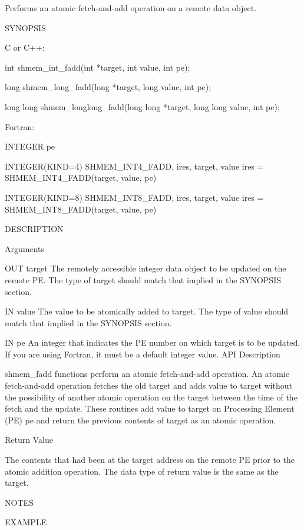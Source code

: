        Performs an atomic fetch-and-add operation	 on  a
       remote data object.

SYNOPSIS

       C or C++:

	  int shmem_int_fadd(int *target, int value, int pe);

	  long shmem_long_fadd(long *target, long value, int pe);

	  long	long  shmem_longlong_fadd(long	long *target, long long value,
	  int pe);

       Fortran:

	  INTEGER pe

	  INTEGER(KIND=4) SHMEM_INT4_FADD, ires, target, value
	  ires = SHMEM_INT4_FADD(target, value, pe)

	  INTEGER(KIND=8) SHMEM_INT8_FADD, ires, target, value
	  ires = SHMEM_INT8_FADD(target, value, pe)


DESCRIPTION

Arguments

	OUT       target	 The  remotely accessible integer data object to be updated on
		 the remote PE.	 The type of target should match that  implied
		 in the SYNOPSIS section.

       IN	value	 The  value  to	 be  atomically	 added to target.  The type of
		 value should match that implied in the SYNOPSIS section.

       IN	pe	 An integer that indicates the PE number on which target is to
		 be  updated.	If you are using Fortran, it must be a default
		 integer value.
API Description

       shmem_fadd functions perform an	atomic	fetch-and-add  operation.   An
       atomic fetch-and-add operation fetches the old target and adds value to
       target without the  possibility	of  another atomic operation on the target
       between the time of the fetch and the update.  These routines add value
       to target on  Processing	 Element  (PE)	pe  and	 return	 the  previous
       contents of target as an atomic operation.

Return Value

       The contents that had been at the target address on the remote PE prior
       to the atomic addition operation. The data type of return value is the same as the target.


NOTES

EXAMPLE

	

